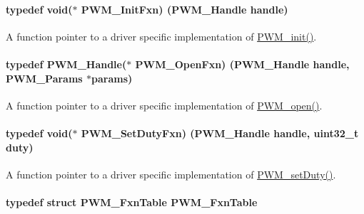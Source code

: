 \paragraph[{P\+W\+M\+\_\+\+Init\+Fxn}]{\setlength{\rightskip}{0pt plus 5cm}typedef void($\ast$ P\+W\+M\+\_\+\+Init\+Fxn) ({\bf P\+W\+M\+\_\+\+Handle} handle)}\label{_p_w_m_8h_a38666ae4b117b81d35758258012b251a}


A function pointer to a driver specific implementation of \hyperlink{_p_w_m_8h_aadae3fe77e36cbf9643a22eeb99fb01e}{P\+W\+M\+\_\+init()}. 

\paragraph[{P\+W\+M\+\_\+\+Open\+Fxn}]{\setlength{\rightskip}{0pt plus 5cm}typedef {\bf P\+W\+M\+\_\+\+Handle}($\ast$ P\+W\+M\+\_\+\+Open\+Fxn) ({\bf P\+W\+M\+\_\+\+Handle} handle, {\bf P\+W\+M\+\_\+\+Params} $\ast$params)}\label{_p_w_m_8h_a16b7b446398f8b90e4fa287c6e4a0981}


A function pointer to a driver specific implementation of \hyperlink{_p_w_m_8h_ac963beab0c5c6901bf852f175028aeaf}{P\+W\+M\+\_\+open()}. 

\paragraph[{P\+W\+M\+\_\+\+Set\+Duty\+Fxn}]{\setlength{\rightskip}{0pt plus 5cm}typedef void($\ast$ P\+W\+M\+\_\+\+Set\+Duty\+Fxn) ({\bf P\+W\+M\+\_\+\+Handle} handle, uint32\+\_\+t duty)}\label{_p_w_m_8h_a4d729a443944bea99ae30cb09a0035ee}


A function pointer to a driver specific implementation of \hyperlink{_p_w_m_8h_a9b4c4b744af933d4f2678dc18b49bfb4}{P\+W\+M\+\_\+set\+Duty()}. 

\paragraph[{P\+W\+M\+\_\+\+Fxn\+Table}]{\setlength{\rightskip}{0pt plus 5cm}typedef struct {\bf P\+W\+M\+\_\+\+Fxn\+Table}  {\bf P\+W\+M\+\_\+\+Fxn\+Table}}\label{_p_w_m_8h_a05890cc4f17c4343ff0ee612561fe267}


